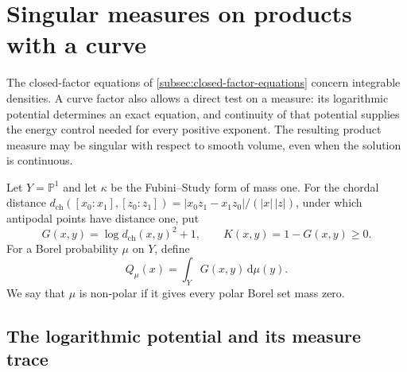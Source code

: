 \section{Singular measures on products with a curve}
\label{sec:continuous-potential-product-measures}

The closed-factor equations of \cref{subsec:closed-factor-equations} concern integrable densities. A curve factor also allows a direct test on a measure: its logarithmic potential determines an exact equation, and continuity of that potential supplies the energy control needed for every positive exponent. The resulting product measure may be singular with respect to smooth volume, even when the solution is continuous.

Let $Y=\mathbb P^1$ and let $\kappa$ be the Fubini--Study form of mass one. For the chordal distance $d_{\mathrm{ch}}([x_0:x_1],[z_0:z_1])=|x_0z_1-x_1z_0|/(|x|\,|z|)$, under which antipodal points have distance one, put
\[
 G(x,y)=\log d_{\mathrm{ch}}(x,y)^2+1,\qquad K(x,y)=1-G(x,y)\geq0.
\]
For a Borel probability $\mu$ on $Y$, define
\begin{equation}\label{eq:curve-measure-green-potential}
 Q_\mu(x)=\int_YG(x,y)\,\mathrm d\mu(y).
\end{equation}
We say that $\mu$ is non-polar if it gives every polar Borel set mass zero.

\subsection{The logarithmic potential and its measure trace}

